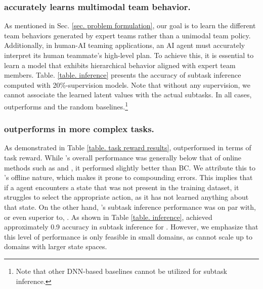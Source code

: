 

\subsubsection{\ouralgsh accurately learns multimodal team behavior.} As mentioned in Sec. \ref{sec. problem formulation}, our goal is to learn the different team behaviors generated by expert teams rather than a unimodal team policy. Additionally, in human-AI teaming applications, an AI agent must accurately interpret its human teammate's high-level plan. To achieve this, it is essential to learn a model that exhibits hierarchical behavior aligned with expert team members.
Table. \ref{table. inference} presents the accuracy of subtask inference computed with 20\%-supervision models. Note that without any supervision, we cannot associate the learned latent values with the actual subtasks. In all cases, \ouralgsh outperforms \maogailsh and the random baselines.\footnote{Note that other DNN-based baselines cannot be utilized for subtask inference.} 

\subsubsection{\ouralgsh outperforms \btil in more complex tasks.}
As demonstrated in Table \ref{table. task reward results}, \ouralg outperformed \btil in terms of task reward. While \btil's overall performance was generally below that of online methods such as \maogail and \ouralg, it performed slightly better than BC. We attribute this to \btil's offline nature, which makes it prone to compounding errors. This implies that if a \btil agent encounters a state that was not present in the training dataset, it struggles to select the appropriate action, as it has not learned anything about that state.
On the other hand, \btil's subtask inference performance was on par with, or even superior to, \ouralg. As shown in Table \ref{table. inference}, \btil achieved approximately 0.9 accuracy in subtask inference for \movers. However, we emphasize that this level of performance is only feasible in small domains, as \btil cannot scale up to domains with larger state spaces.


